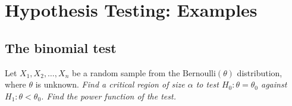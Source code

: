 \chapter{Hypothesis Testing: Examples}\label{chap:hypothesis-testing-examples}
\setcounter{page}{1}
\startcontents[chapters]
\chapcontents

\section{The binomial test}
\begin{example}
 Let $X_1,X_2,\ldots,X_n$ be a random sample from the $\text{Bernoulli}(\theta)$ distribution, where $\theta$ is unknown.
\ben
\it Find a critical region of size $\alpha$ to test $H_0:\theta=\theta_0$ against $H_1:\theta<\theta_0$.
\it Find the power function of the test.
\een
\end{example}

